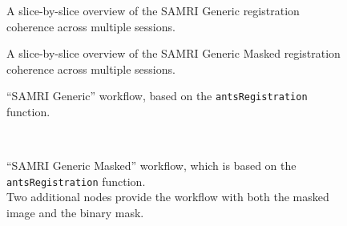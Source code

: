 \begin{figure*}[h!]
    \centering
    \begin{subfigure}[t]{1\textwidth}
        \centering
        \setlength{\fboxsep}{0pt}%
        \setlength{\fboxrule}{0.2pt}%
        \caption{A slice-by-slice overview of the SAMRI Generic registration coherence across multiple sessions.}
    \end{subfigure}
\end{figure*}
\begin{figure*}[h!]
    \ContinuedFloat
    \begin{subfigure}[t]{1\textwidth}
        \centering
        \setlength{\fboxsep}{0pt}%
        \setlength{\fboxrule}{0.2pt}%
        \caption{A slice-by-slice overview of the SAMRI Generic Masked registration coherence across multiple sessions.}
    \end{subfigure}
    \caption{
    \textbf{Both the SAMRI Generic and the Generic Masked workflow present a consistent mapping across sessions.}
    }
    \label{fig:coherence}
\end{figure*}

\begin{figure*}[h!]
    \begin{subfigure}{0.70\textwidth}
        \centering
        \vspace{-1.9em}
        \caption{
        “SAMRI Generic” workflow, based on the \textcolor{mg}{\texttt{antsRegistration}} function.
        }
        \label{fig:nwfgg}
    \end{subfigure}
    \\
    \begin{subfigure}{0.70\linewidth}
        \centering
        \vspace{-1.9em}
        \caption{
        “SAMRI Generic Masked” workflow, which is based on the \textcolor{mg}{\texttt{antsRegistration}} function.\\
        Two additional nodes provide the workflow with both the masked image and the binary mask.
        }
        \label{fig:nwfgl}
    \end{subfigure}\hfill
    \caption{
    Directed acyclic graphs visualising the two registration workflows.
    Each node name is depicted together with its corresponding package name in paranthesis.
    The “utility” indication corresponds to nodes based on Python functions specific to the workflow, distributed alongside it, and dynamically wrapped via Nipype.
    }
    \label{fig:nwfg}
\end{figure*}

